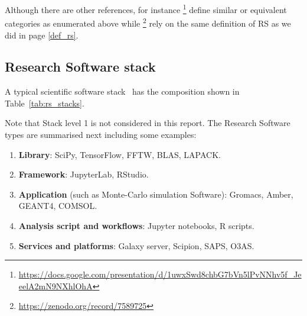 Although there are other references, for instance \footnote{\url{https://docs.google.com/presentation/d/1uwxSwd8chbG7bVn5lPvNNhv5f_JeeelA2mN9NXhlOhA}} define similar or equivalent categories as enumerated above while \footnote{\url{https://zenodo.org/record/7589725}} rely on the same definition of RS as we did in page \ref{def_rs}.

\subsection{Research Software stack}

A typical scientific software stack~\cite{hinsen2019} has the composition shown in Table~\ref{tab:rs_stacks}.

Note that Stack level 1 is not considered in this report. The Research Software types are summarised next including some examples:

\begin{enumerate}
    \item \textbf{Library}: SciPy, TensorFlow, FFTW, BLAS, LAPACK.
    \item \textbf{Framework}: JupyterLab, RStudio.
    \item \textbf{Application} (such as Monte-Carlo simulation Software): Gromacs, Amber, GEANT4, COMSOL.
    \item \textbf{Analysis script and workflows}: Jupyter notebooks, R scripts.
    \item \textbf{Services and platforms}: Galaxy server, Scipion, SAPS, O3AS.
\end{enumerate}

